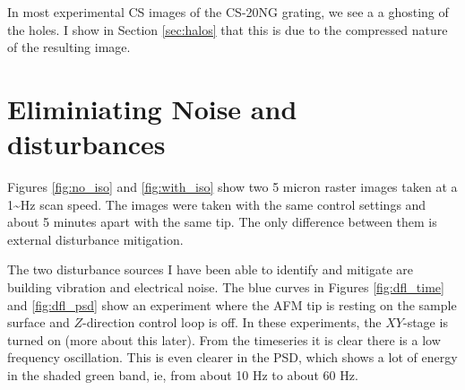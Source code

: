 \documentclass[11pt]{article}
\begin{document}
In most experimental CS images of the CS-20NG grating, we see a a ghosting of the holes. I show in Section \ref{sec:halos} that this is due to the compressed nature of the resulting image. 


\section{Eliminiating Noise and disturbances \label{sec:noise}}
\label{sec:orgd7da44e}
Figures \ref{fig:no_iso} and \ref{fig:with_iso} show two 5 micron raster images taken at a 1\textasciitilde{}Hz scan speed. The images were taken with the same control settings and about 5 minutes apart with the same tip. The only difference between them is external disturbance mitigation. 

\begin{figure*}
\begin{center}

\end{center}
\begin{center}

\end{center}
\end{figure*}

The two disturbance sources I have been able to identify and mitigate are building vibration and electrical noise. The blue curves in Figures \ref{fig:dfl_time} and \ref{fig:dfl_psd} show an experiment where the AFM tip is resting on the sample surface and \(Z\)-direction control loop is off. In these experiments, the \(XY\)-stage is turned on (more about this later). From the timeseries it is clear there is a low frequency oscillation. This is even clearer in the PSD, which shows a lot of energy in the shaded green band, ie, from about 10 Hz to about 60 Hz. 

\begin{figure*}
\begin{minipage}{0.5\textwidth}
\centering

\caption{\label{fig:dfl_time}
Time Series of the deflection signal. The blue curves are the unmodified instrument, the orange curves are the instrument with vibration isolation and the yellow curves are the with both vibration isolation and using an external power source to run the nPoint cooling fan.}
\end{minipage}                              

\begin{minipage}{0.5\textwidth}
\centering

\caption{\label{fig:dfl_psd}
PSDs of the deflection signal. The shaded band indicates the domain region of building vibration.}
\end{minipage}                      
\end{figure*}
\end{document}
